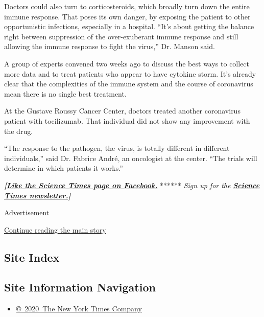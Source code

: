 Doctors could also turn to corticosteroids, which broadly turn down the
entire immune response. That poses its own danger, by exposing the
patient to other opportunistic infections, especially in a hospital.
``It's about getting the balance right between suppression of the
over-exuberant immune response and still allowing the immune response to
fight the virus,'' Dr. Manson said.

A group of experts convened two weeks ago to discuss the best ways to
collect more data and to treat patients who appear to have cytokine
storm. It's already clear that the complexities of the immune system and
the course of coronavirus mean there is no single best treatment.

At the Gustave Roussy Cancer Center, doctors treated another coronavirus
patient with tocilizumab. That individual did not show any improvement
with the drug.

``The response to the pathogen, the virus, is totally different in
different individuals,'' said Dr. Fabrice André, an oncologist at the
center. ``The trials will determine in which patients it works.''

\textbf{\emph{{[}}\href{http://on.fb.me/1paTQ1h}{\emph{Like the Science
Times page on Facebook.}}} ****** \emph{\textbar{} Sign up for the}
\textbf{\href{http://nyti.ms/1MbHaRU}{\emph{Science Times
newsletter.}}\emph{{]}}}

Advertisement

\protect\hyperlink{after-bottom}{Continue reading the main story}

\hypertarget{site-index}{%
\subsection{Site Index}\label{site-index}}

\hypertarget{site-information-navigation}{%
\subsection{Site Information
Navigation}\label{site-information-navigation}}

\begin{itemize}
\tightlist
\item
  \href{https://help.nytimes3xbfgragh.onion/hc/en-us/articles/115014792127-Copyright-notice}{©~2020~The
  New York Times Company}
\end{itemize}

